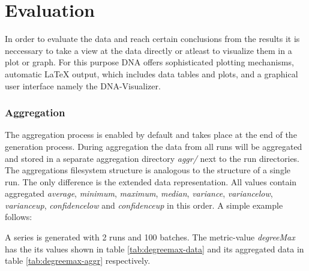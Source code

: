 \chapter{Evaluation}
In order to evaluate the data and reach certain conclusions from the results it is neccessary to take a view at the data directly or atleast to visualize them in a plot or graph. For this purpose DNA offers sophisticated plotting mechanisms, automatic LaTeX output, which includes data tables and plots, and a graphical user interface namely the DNA-Visualizer.

\subsection{Aggregation}
The aggregation process is enabled by default and takes place at the end of the generation process. During aggregation the data from all runs will be aggregated and stored in a separate aggregation directory \textit{aggr/} next to the run directories. The aggregations filesystem structure is analogous to the structure of a single run. The only difference is the extended data representation. All values contain aggregated \textit{average}, \textit{minimum}, \textit{maximum}, \textit{median}, \textit{variance}, \textit{variance\textunderscore low}, \textit{variance\textunderscore up}, \textit{confidence\textunderscore low} and \textit{confidence\textunderscore up} in this order. A simple example follows:

A series is generated with 2 runs and 100 batches. The metric-value \textit{degreeMax} has the its values shown in table \ref{tab:degreemax-data} and its aggregated data in table \ref{tab:degreemax-aggr} respectively.

